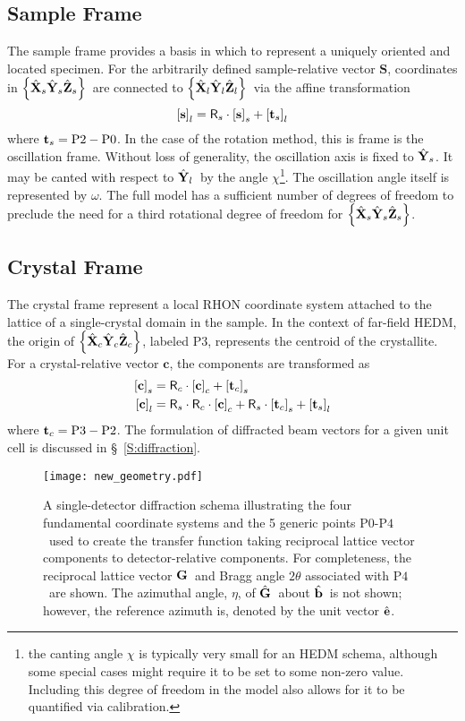 \documentclass[12pt,letterpaper,final]{amsart}
\newcommand{\mbm}[1]{\ensuremath{\mbox{\boldmath$#1$}}}
\newcommand{\tvecs}{\ensuremath{\mbm{\mathrm{t}}_s}}
\newcommand{\tvecc}{\ensuremath{\mbm{\mathrm{t}}_c}}
\newcommand{\rmats}{\ensuremath{\mathsf{R}_s}}
\newcommand{\rmatc}{\ensuremath{\mathsf{R}_c}}
\newcommand{\gvec}{\ensuremath{\mbm{\mathrm{G}}}}
\newcommand{\ghat}{\ensuremath{\hat{\mbm{\mathrm{G}}}}}
\newcommand{\bhat}{\ensuremath{\hat{\mbm{\mathrm{b}}}}}
\newcommand{\ehat}{\ensuremath{\hat{\mbm{\mathrm{e}}}}}
\newcommand{\Pzero}{\ensuremath{\mathrm{P0}}}
\newcommand{\Ptwo}{\ensuremath{\mathrm{P2}}}
\newcommand{\Pthree}{\ensuremath{\mathrm{P3}}}
\newcommand{\Pfour}{\ensuremath{\mathrm{P4}}}
\newcommand{\Xl}{\ensuremath{\hat{\mbm{\mathrm{X}}}_l}}
\newcommand{\Yl}{\ensuremath{\hat{\mbm{\mathrm{Y}}}_l}}
\newcommand{\Zl}{\ensuremath{\hat{\mbm{\mathrm{Z}}}_l}}
\newcommand{\labframe}{\ensuremath{\left\{\Xl\Yl\Zl\right\}}}
\newcommand{\Xs}{\ensuremath{\hat{\mbm{\mathrm{X}}}_s}}
\newcommand{\Ys}{\ensuremath{\hat{\mbm{\mathrm{Y}}}_s}}
\newcommand{\Zs}{\ensuremath{\hat{\mbm{\mathrm{Z}}}_s}}
\newcommand{\sampframe}{\ensuremath{\left\{\Xs\Ys\Zs\right\}}}
\newcommand{\Xc}{\ensuremath{\hat{\mbm{\mathrm{X}}}_c}}
\newcommand{\Yc}{\ensuremath{\hat{\mbm{\mathrm{Y}}}_c}}
\newcommand{\Zc}{\ensuremath{\hat{\mbm{\mathrm{Z}}}_c}}
\newcommand{\crysframe}{\ensuremath{\left\{\Xc\Yc\Zc\right\}}}
\newcommand{\labcomps}[1]{\left[#1\right]_l}
\newcommand{\sampcomps}[1]{\left[#1\right]_s}
\newcommand{\cryscomps}[1]{\left[#1\right]_c}
\newcommand{\secref}[1]{\S~\ref{#1}}
\begin{document}
\subsection{Sample Frame}\label{S:sample}
The sample frame provides a basis in which to represent a uniquely
oriented and located specimen.  For the arbitrarily defined
sample-relative vector $\mathbf{S}$, coordinates in \sampframe\ are
connected to \labframe\ via the affine transformation
\begin{equation}
  \labcomps{\mathbf{s}} = \rmats\cdot\sampcomps{\mathbf{s}} + \labcomps{\tvecs}  
\end{equation}
where $\tvecs=\Ptwo-\Pzero$.  In the case of the rotation method, this
is frame is the oscillation frame.  Without loss of generality, the
oscillation axis is fixed to \Ys.  It may be canted with respect to
\Yl\ by the angle $\chi$\footnote{the canting angle $\chi$ is
  typically very small for an HEDM schema, although some special cases
  might require it to be set to some non-zero value.  Including this
  degree of freedom in the model also allows for it to be quantified
  via calibration.}.  The oscillation angle itself is represented by
$\omega$.  The full model has a sufficient number of degrees of
freedom to preclude the need for a third rotational degree of freedom
for \sampframe.

\subsection{Crystal Frame}\label{S:crystal}
The crystal frame represent a local RHON coordinate system attached to
the lattice of a single-crystal domain in the sample.  In the context
of far-field HEDM, the origin of \crysframe, labeled \Pthree,
represents the centroid of the crystallite.  For a crystal-relative
vector $\mathbf{c}$, the components are transformed as
\begin{align}
  \sampcomps{\mathbf{c}} &= \rmatc\cdot\cryscomps{\mathbf{c}} + \sampcomps{\tvecc}\\
  \labcomps{\mathbf{c}} &= \rmats\cdot\rmatc\cdot\cryscomps{\mathbf{c}} + \rmats\cdot\sampcomps{\tvecc} + \labcomps{\tvecs}
\end{align}
where $\tvecc=\Pthree-\Ptwo$.  The formulation of diffracted beam vectors for a given unit cell is discussed in \secref{S:diffraction}.
\begin{figure}[htb]
  \centering
  \texttt{[image: new\_geometry.pdf]}
  \caption{A single-detector diffraction schema illustrating the four
    fundamental coordinate systems and the 5 generic points
    \Pzero-\Pfour\ used to create the transfer function taking
    reciprocal lattice vector components to detector-relative
    components.  For completeness, the reciprocal lattice vector
    \gvec\ and Bragg angle $2\theta$ associated with \Pfour\ are
    shown.  The azimuthal angle, $\eta$, of \ghat\ about \bhat\ is not
    shown; however, the reference azimuth is, denoted by the unit
    vector \ehat. }
  \label{F:diffraction_schema}
\end{figure}
\end{document}
